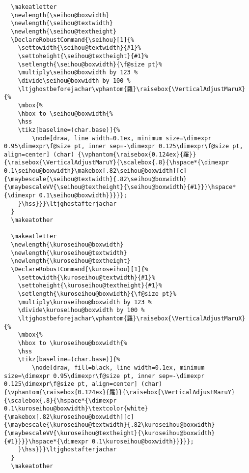 \documentclass[luatex,fontsize=10pt,paper=b5,twoside]{jlreq}%
\begin{document}
\begin{lstlisting}
  \makeatletter
  \newlength{\seihou@boxwidth}
  \newlength{\seihou@textwidth}
  \newlength{\seihou@textheight}
  \DeclareRobustCommand{\seihou}[1]{%
    \settowidth{\seihou@textwidth}{#1}%
    \settoheight{\seihou@textheight}{#1}%
    \setlength{\seihou@boxwidth}{\f@size pt}%
    \multiply\seihou@boxwidth by 123 %
    \divide\seihou@boxwidth by 100 %
    \ltjghostbeforejachar\vphantom{羅}\raisebox{\VerticalAdjustMaruX}{%
    \mbox{%
    \hbox to \seihou@boxwidth{%
    \hss
    \tikz[baseline=(char.base)]{%
        \node[draw, line width=0.1ex, minimum size=\dimexpr 0.95\dimexpr\f@size pt, inner sep=-\dimexpr 0.125\dimexpr\f@size pt, align=center] (char) {\vphantom{\raisebox{0.124ex}{羅}}{\raisebox{\VerticalAdjustMaruY}{\scalebox{.8}{\hspace*{\dimexpr 0.1\seihou@boxwidth}\makebox[.82\seihou@boxwidth][c]{\maybescale{\seihou@textwidth}{.82\seihou@boxwidth}{\maybescaleVV{\seihou@textheight}{\seihou@boxwidth}{#1}}}\hspace*{\dimexpr 0.1\seihou@boxwidth}}}}};
    }\hss}}}\ltjghostafterjachar
  }
  \makeatother

  \makeatletter
  \newlength{\kuroseihou@boxwidth}
  \newlength{\kuroseihou@textwidth}
  \newlength{\kuroseihou@textheight}
  \DeclareRobustCommand{\kuroseihou}[1]{%
    \settowidth{\kuroseihou@textwidth}{#1}%
    \settoheight{\kuroseihou@textheight}{#1}%
    \setlength{\kuroseihou@boxwidth}{\f@size pt}%
    \multiply\kuroseihou@boxwidth by 123 %
    \divide\kuroseihou@boxwidth by 100 %
    \ltjghostbeforejachar\vphantom{羅}\raisebox{\VerticalAdjustMaruX}{%
    \mbox{%
    \hbox to \kuroseihou@boxwidth{%
    \hss
    \tikz[baseline=(char.base)]{%
        \node[draw, fill=black, line width=0.1ex, minimum size=\dimexpr 0.95\dimexpr\f@size pt, inner sep=-\dimexpr 0.125\dimexpr\f@size pt, align=center] (char) {\vphantom{\raisebox{0.124ex}{羅}}{\raisebox{\VerticalAdjustMaruY}{\scalebox{.8}{\hspace*{\dimexpr 0.1\kuroseihou@boxwidth}\textcolor{white}{\makebox[.82\kuroseihou@boxwidth][c]{\maybescale{\kuroseihou@textwidth}{.82\kuroseihou@boxwidth}{\maybescaleVV{\kuroseihou@textheight}{\kuroseihou@boxwidth}{#1}}}}\hspace*{\dimexpr 0.1\kuroseihou@boxwidth}}}}};
    }\hss}}}\ltjghostafterjachar
  }
  \makeatother


\end{lstlisting}
\end{document}
